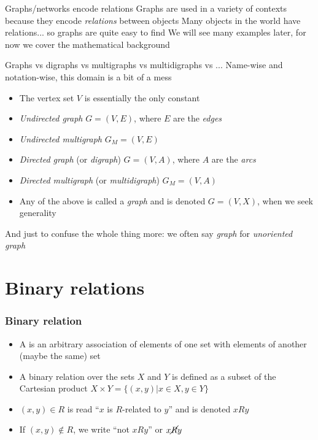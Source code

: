 \documentclass[aspectratio=43]{beamer}
\begin{document}
\begin{frame}{Graphs/networks encode relations}
	Graphs are used in a variety of contexts because they encode \emph{relations} between objects
	\vfill
	Many objects in the world have relations... so graphs are quite easy to find
	\vfill
	We will see many examples later, for now we cover the mathematical background
\end{frame}



\begin{frame}{Graphs vs digraphs vs multigraphs vs multidigraphs vs ...}
	Name-wise and notation-wise, this domain is a bit of a mess
	\vfill
	\begin{itemize}
		\item The vertex set $V$ is essentially the only constant
		\item \emph{Undirected graph} $G=(V,E)$, where $E$ are the \emph{edges}
		\item \emph{Undirected multigraph} $G_M=(V,E)$
		\item \emph{Directed graph} (or \emph{digraph}) $G=(V,A)$, where $A$ are the \emph{arcs}
		\item \emph{Directed multigraph} (or \emph{multidigraph}) $G_M=(V,A)$
		\item Any of the above is called a \emph{graph} and is denoted $G=(V,X)$, when we seek generality
	\end{itemize}
	\vfill
And just to confuse the whole thing more: we often say \emph{graph} for \emph{unoriented graph}
\end{frame}

\section{Binary relations}

\begin{frame}\frametitle{Binary relation}
	\begin{definition}
	\begin{itemize}
	\item A  is an arbitrary association of elements of one set with elements of another (maybe the same) set
	\item  A binary relation over the sets $X$ and $Y$ is defined as a subset of the Cartesian product $X\times Y =\{(x,y)| x\in X , y\in Y\}$
	\item $(x,y)\in R$ is read ``$x$ is $R$-related to $y$'' and is denoted $xRy$
	\item If $(x,y)\not\in R$, we write ``not $x R y$'' or $x\cancel{R} y$
	\end{itemize}
	\end{definition}
\end{frame}
	
\end{document}
